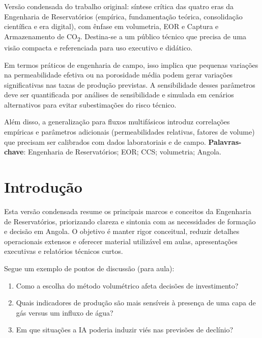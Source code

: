 \documentclass[
  12pt,
  a4paper,
  oneside,
  brazilian,
  sumario=tradicional
]{abntex2}
\begin{document}
\pretextual
\imprimircapa
\begin{resumo}
Versão condensada do trabalho original: síntese crítica das quatro eras da
Engenharia de Reservatórios (empírica, fundamentação teórica, consolidação
científica e era digital), com ênfase em volumetria, EOR e Captura e
Armazenamento de CO\textsubscript{2}. Destina-se a um público técnico que
precisa de uma visão compacta e referenciada para uso executivo e didático.
\vspace{6pt}

Em termos práticos de engenharia de campo, isso implica que pequenas variações
na permeabilidade efetiva ou na porosidade média podem gerar variações
significativas nas taxas de produção previstas. A sensibilidade desses
parâmetros deve ser quantificada por análises de sensibilidade e simulada em
cenários alternativos para evitar subestimações do risco técnico.

Além disso, a generalização para fluxos multifásicos introduz correlações
empíricas e parâmetros adicionais (permeabilidades relativas, fatores de
volume) que precisam ser calibrados com dados laboratoriais e de campo.
\noindent\textbf{Palavras-chave}: Engenharia de Reservatórios; EOR; CCS; volumetria; Angola.
\end{resumo}
\cleardoublepage
\textual

\chapter{Introdução}
Esta versão condensada resume os principais marcos e conceitos da Engenharia de
Reservatórios, priorizando clareza e sintonia com as necessidades de formação
e decisão em Angola. O objetivo é manter rigor conceitual, reduzir detalhes
operacionais extensos e oferecer material utilizável em aulas, apresentações
executivas e relatórios técnicos curtos.

Segue um exemplo de pontos de discussão (para aula):
\begin{enumerate}
  \item Como a escolha do método volumétrico afeta decisões de investimento?
  \item Quais indicadores de produção são mais sensíveis à presença de uma
    capa de gás versus um influxo de água?
  \item Em que situações a IA poderia induzir viés nas previsões de declínio?
\end{enumerate}
\end{document}
